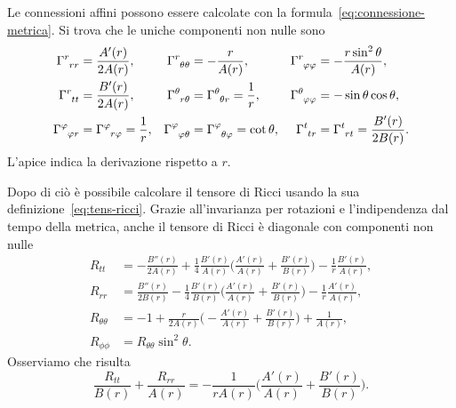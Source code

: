 Le connessioni affini possono essere calcolate con la
formula~\eqref{eq:connessione-metrica}.  Si trova che le uniche componenti non
nulle sono
\begin{subequations}
  \begin{align}
    \tensor{\Gamma}{^{r}_{rr}} &= \frac{A'(r)}{2A(r)}, &
    \tensor{\Gamma}{^{r}_{\theta\theta}} &= -\frac{r}{A(r)}, &
    \tensor{\Gamma}{^{r}_{\phi\phi}} &= -\frac{r \sin^{2}\theta}{A(r)}, \\
    \tensor{\Gamma}{^{r}_{tt}} &= \frac{B'(r)}{2A(r)}, &
    \tensor{\Gamma}{^{\theta}_{r\theta}} &=
    \tensor{\Gamma}{^{\theta}_{\theta r}} = \frac{1}{r}, &
    \tensor{\Gamma}{^{\theta}_{\phi\phi}} &= -\sin\theta \cos\theta, \\
    \tensor{\Gamma}{^{\phi}_{\phi r}} &= \tensor{\Gamma}{^{\phi}_{r\phi}} =
    \frac{1}{r}, & \tensor{\Gamma}{^{\phi}_{\phi\theta}} &=
    \tensor{\Gamma}{^{\phi}_{\theta\phi}} = \cot\theta, &
    \tensor{\Gamma}{^{t}_{tr}} &= \tensor{\Gamma}{^{t}_{rt}} =
    \frac{B'(r)}{2B(r)}.
  \end{align}
\end{subequations}
L'apice indica la derivazione rispetto a $r$.

Dopo di ciò è possibile calcolare il tensore di Ricci usando la sua
definizione~\eqref{eq:tens-ricci}.  Grazie all'invarianza per rotazioni e
l'indipendenza dal tempo della metrica, anche il tensore di Ricci è diagonale
con componenti non nulle
\begin{subequations}
  \label{eq:ricci-sferico}
  \begin{align}
    R_{tt} &= -\frac{B''(r)}{2A(r)} + \frac{1}{4} \frac{B'(r)}{A(r)}
    \bigg(\frac{A'(r)}{A(r)} + \frac{B'(r)}{B(r)}\bigg) -
    \frac{1}{r}\frac{B'(r)}{A(r)}, \\
    R_{rr} &= \frac{B''(r)}{2B(r)} - \frac{1}{4} \frac{B'(r)}{B(r)}
    \bigg(\frac{A'(r)}{A(r)} + \frac{B'(r)}{B(r)}\bigg) -
    \frac{1}{r}\frac{A'(r)}{A(r)}, \\
    R_{\theta\theta} &= -1 + \frac{r}{2A(r)}\bigg(-\frac{A'(r)}{A(r)} +
    \frac{B'(r)}{B(r)}\bigg) + \frac{1}{A(r)}, \\
    R_{\phi\phi} &= R_{\theta\theta} \sin^{2}\theta.
  \end{align}
\end{subequations}
Osserviamo che risulta
\begin{equation}
  \label{eq:bar}
  \frac{R_{tt}}{B(r)} + \frac{R_{rr}}{A(r)} =
  -\frac{1}{rA(r)}\bigg(\frac{A'(r)}{A(r)} + \frac{B'(r)}{B(r)}\bigg).
\end{equation}

